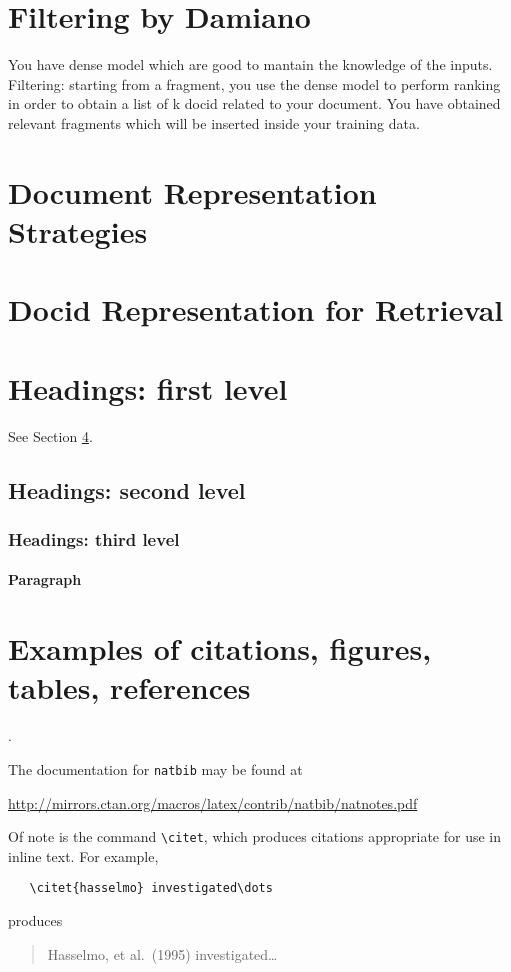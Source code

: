 \documentclass{article}
\begin{document}
\section{Filtering by Damiano}
You have dense model which are good to mantain the knowledge of the inputs.
Filtering: starting from a fragment, you use the dense model to perform ranking in order to obtain a list of k docid related to your document. You have obtained relevant fragments which will be inserted inside your training data.

\section{Document Representation Strategies}

\section{Docid Representation for Retrieval}

\section{Headings: first level}
\label{sec:headings}
See Section \ref{sec:headings}.

\subsection{Headings: second level}

\subsubsection{Headings: third level}

\paragraph{Paragraph}

\section{Examples of citations, figures, tables, references}
\label{sec:others}
\cite{pyserini}.

The documentation for \verb+natbib+ may be found at
\begin{center}
  \url{http://mirrors.ctan.org/macros/latex/contrib/natbib/natnotes.pdf}
\end{center}
Of note is the command \verb+\citet+, which produces citations
appropriate for use in inline text.  For example,
\begin{verbatim}
   \citet{hasselmo} investigated\dots
\end{verbatim}
produces
\begin{quote}
  Hasselmo, et al.\ (1995) investigated\dots
\end{quote}
\end{document}
